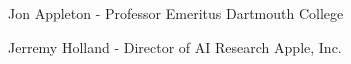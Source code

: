 

\begin{cvhonors}

  \cvhonor
    {Jon Appleton - Professor Emeritus} %
    {Dartmouth College} %
    {} %
    {} %

  \cvhonor
    {Jerremy Holland - Director of AI Research} %
    {Apple, Inc.} %
    {} %
    {} %

\end{cvhonors}
